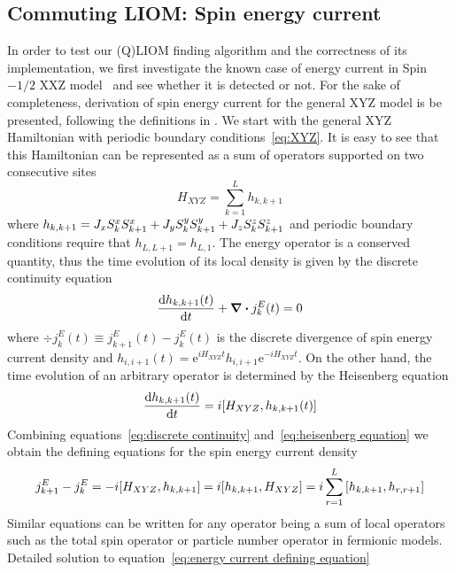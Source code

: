 \subsection{Commuting LIOM: Spin energy current\label{sec:energy current}}
In order to test our (Q)LIOM finding algorithm and the correctness of its implementation, we first
investigate the known case of energy current in Spin\(-1/2\) XXZ model~\autocite*{Mierzejewski2015Approx}
and see whether it is detected or not. For the sake of completeness, derivation of
spin energy current for the general XYZ model is be presented, following the definitions in \textcite{Zotos1997}.
We start with the general XYZ Hamiltonian with periodic boundary conditions~\eqref{eq:XYZ}.
It is easy to see that this Hamiltonian can be represented as a sum of operators supported on two consecutive sites
\begin{equation}
  H_{XYZ} = \sum_{k=1}^L h_{k,k+1}
\end{equation}
where \(h_{k,k+1} = J_{x} S^{x}_{k}S^{x}_{k+1} + J_{y} S^{y}_{k}S^{y}_{k+1} + J_{z} S^{z}_{k}S^{z}_{k+1} \) and periodic boundary conditions
require that \(h_{L,L+1} = h_{L,1}\). The energy operator is a conserved quantity, thus the time evolution of its local density
is given by the discrete continuity equation
\begin{equation}
  \dv{h_{k,k+1}(t)}{t} + \div{j_{k}^{E}(t)} = 0
  \label{eq:discrete continuity}
\end{equation}
where \(\div{j_{k}^E(t)} \equiv j_{k+1}^E(t) - j_{k}^E(t)\) is the discrete divergence of spin energy current density and \(h_{i,i+1}(t) = \mathrm{e}^{i H_{XYZ}t} h_{i,i+1} \mathrm{e}^{-i H_{XYZ} t}\).
On the other hand, the time evolution of an arbitrary operator is determined
by the Heisenberg equation
\begin{equation}
  \dv{h_{k,k+1}(t)}{t} = i \comm{H_{XYZ}}{h_{k,k+1}(t)}
  \label{eq:heisenberg equation}
\end{equation}
Combining equations~\eqref{eq:discrete continuity} and~\eqref{eq:heisenberg equation} we obtain the defining equations for
the spin energy current density
\begin{equation}
  j_{k+1}^E - j_{k}^E = - i \comm{H_{XYZ}}{h_{k,k+1}} = i \comm{h_{k,k+1}}{H_{XYZ}} = i \sum_{r=1}^L \comm{h_{k,k+1}}{h_{r,r+1}}
  \label{eq:energy current defining equation}
\end{equation}
Similar equations can be written for any operator being a sum of local operators such as
the total spin operator or particle number operator in fermionic models. Detailed solution to equation~\eqref{eq:energy current defining equation}
